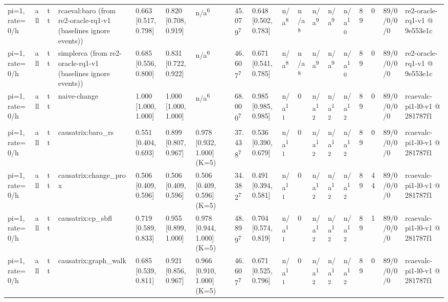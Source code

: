 \begin{table}[t]
\begin{tabular}{llllllllllllllllll}
pi=1, rate=0/h & all & tt & rcaeval:baro (from re2-oracle-rq1-v1 (baselines ignore events)) & 0.663 [0.517, 0.798] & 0.820 [0.708, 0.919] & n/a\textsuperscript{6} & 45.079\textsuperscript{7} & 0.648 [0.502, 0.783] & n/a\textsuperscript{8} & n/a\textsuperscript{8} & n/a\textsuperscript{9} & n/a\textsuperscript{9} & n/a\textsuperscript{10} & 89 & 0 & 89/0/0/0/0 & re2-oracle-rq1-v1 @ 9e553e1c \\
pi=1, rate=0/h & all & tt & simplerca (from re2-oracle-rq1-v1 (baselines ignore events)) & 0.685 [0.556, 0.800] & 0.831 [0.722, 0.922] & n/a\textsuperscript{6} & 46.607\textsuperscript{7} & 0.671 [0.541, 0.785] & n/a\textsuperscript{8} & n/a\textsuperscript{8} & n/a\textsuperscript{9} & n/a\textsuperscript{9} & n/a\textsuperscript{10} & 89 & 0 & 89/0/0/0/0 & re2-oracle-rq1-v1 @ 9e553e1c \\
pi=1, rate=0/h & all & tt & naive-change & 1.000 [1.000, 1.000] & 1.000 [1.000, 1.000] & n/a\textsuperscript{6} & 68.000\textsuperscript{7} & 0.985 [0.985, 0.985] & n/a\textsuperscript{11} & 0 & n/a\textsuperscript{12} & n/a\textsuperscript{12} & n/a\textsuperscript{12} & 89 & 0 & 89/0/0/0/0 & rcaevalc-pi1-l0-v1 @ 281787f1 \\
pi=1, rate=0/h & all & tt & causatrix:baro\_rs & 0.551 [0.404, 0.693] & 0.899 [0.807, 0.967] & 0.978 [0.932, 1.000] (K=5) & 37.438\textsuperscript{7} & 0.536 [0.390, 0.679] & n/a\textsuperscript{11} & 0 & n/a\textsuperscript{12} & n/a\textsuperscript{12} & n/a\textsuperscript{12} & 89 & 0 & 89/0/0/0/0 & rcaevalc-pi1-l0-v1 @ 281787f1 \\
pi=1, rate=0/h & all & tt & causatrix:change\_prox & 0.506 [0.409, 0.596] & 0.506 [0.409, 0.596] & 0.506 [0.409, 0.596] (K=5) & 34.382\textsuperscript{7} & 0.491 [0.394, 0.581] & n/a\textsuperscript{11} & 0 & n/a\textsuperscript{12} & n/a\textsuperscript{12} & n/a\textsuperscript{12} & 89 & 44 & 89/0/0/0/0 & rcaevalc-pi1-l0-v1 @ 281787f1 \\
pi=1, rate=0/h & all & tt & causatrix:cp\_sbfl & 0.719 [0.589, 0.833] & 0.955 [0.899, 1.000] & 0.978 [0.944, 1.000] (K=5) & 48.899\textsuperscript{7} & 0.704 [0.574, 0.819] & n/a\textsuperscript{11} & 0 & n/a\textsuperscript{12} & n/a\textsuperscript{12} & n/a\textsuperscript{12} & 89 & 1 & 89/0/0/0/0 & rcaevalc-pi1-l0-v1 @ 281787f1 \\
pi=1, rate=0/h & all & tt & causatrix:graph\_walk & 0.685 [0.539, 0.811] & 0.921 [0.856, 0.967] & 0.966 [0.910, 1.000] (K=5) & 46.607\textsuperscript{7} & 0.671 [0.525, 0.796] & n/a\textsuperscript{11} & 0 & n/a\textsuperscript{12} & n/a\textsuperscript{12} & n/a\textsuperscript{12} & 89 & 0 & 89/0/0/0/0 & rcaevalc-pi1-l0-v1 @ 281787f1 \\

\end{tabular}
\end{table}
